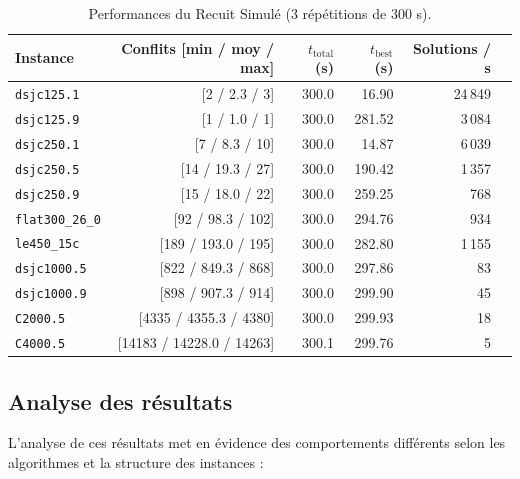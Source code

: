 \documentclass{article}
\begin{document}
\begin{table}[H]
\centering
\small
\setlength{\tabcolsep}{5pt}
\begin{tabular}{lrrrrr}
\toprule
\textbf{Instance} & \textbf{Conflits [min / moy / max]} & \textbf{$t_{\text{total}}$ (s)} & \textbf{$t_{\text{best}}$ (s)} & \textbf{Solutions / s} \\
\midrule
\texttt{dsjc125.1}      & [2 / 2.3 / 3]            & 300.0 & 16.90  & 24\,849 \\
\texttt{dsjc125.9}      & [1 / 1.0 / 1]            & 300.0 & 281.52 & 3\,084 \\
\texttt{dsjc250.1}      & [7 / 8.3 / 10]           & 300.0 & 14.87  & 6\,039 \\
\texttt{dsjc250.5}      & [14 / 19.3 / 27]         & 300.0 & 190.42 & 1\,357 \\
\texttt{dsjc250.9}      & [15 / 18.0 / 22]         & 300.0 & 259.25 & 768 \\
\texttt{flat300\_26\_0} & [92 / 98.3 / 102]        & 300.0 & 294.76 & 934 \\
\texttt{le450\_15c}     & [189 / 193.0 / 195]      & 300.0 & 282.80 & 1\,155 \\
\texttt{dsjc1000.5}     & [822 / 849.3 / 868]      & 300.0 & 297.86 & 83 \\
\texttt{dsjc1000.9}     & [898 / 907.3 / 914]      & 300.0 & 299.90 & 45 \\
\texttt{C2000.5}        & [4335 / 4355.3 / 4380]   & 300.0 & 299.93 & 18 \\
\texttt{C4000.5}        & [14183 / 14228.0 / 14263]& 300.1 & 299.76 & 5 \\
\bottomrule
\end{tabular}
\caption{Performances du Recuit Simulé (3 répétitions de 300 s).}
\label{tab:resultats_recuit}
\end{table}

\subsection{Analyse des résultats}

L'analyse de ces résultats met en évidence des comportements différents selon les algorithmes et la structure des instances :
\end{document}
